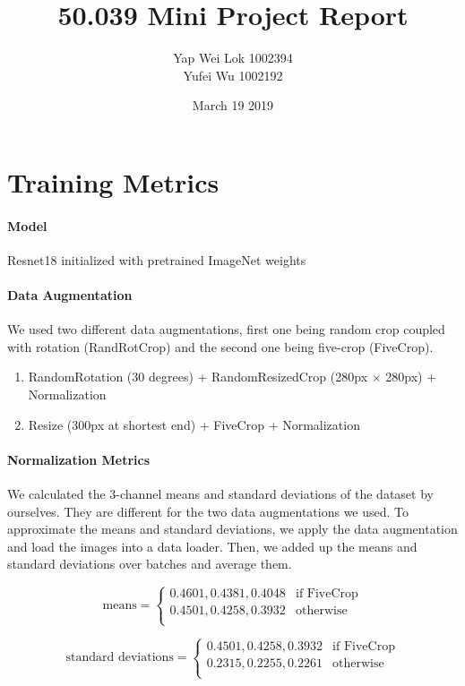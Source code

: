 \documentclass{article}
\title{50.039 Mini Project Report}
\author{Yap Wei Lok 1002394 \\
        Yufei Wu 1002192}
\date{March 19 2019}
\begin{document}
\maketitle
\section{Training Metrics}
\paragraph{Model}
Resnet18 initialized with pretrained ImageNet weights

\paragraph{Data Augmentation}
We used two different data augmentations, first one being random crop coupled with rotation (RandRotCrop) and the second one being five-crop (FiveCrop).
\begin{enumerate}
    \item RandomRotation (30 degrees) + RandomResizedCrop (280px $\times$ 280px) + Normalization
    \item Resize (300px at shortest end) + FiveCrop + Normalization
\end{enumerate}

\paragraph{Normalization Metrics}
We calculated the 3-channel means and standard deviations of the dataset by ourselves. They are different for the two data augmentations we used. To approximate the means and standard deviations, we apply the data augmentation and load the images into a data loader. Then, we added up the means and standard deviations over batches and average them.

\begin{equation*}
    \text{means} =
    \begin{cases} 
        0.4601, 0.4381, 0.4048 & \text{if FiveCrop} \\
        0.4501, 0.4258, 0.3932 & \text{otherwise} \\
    \end{cases}
\end{equation*}

\begin{equation*}
    \text{standard deviations} =
    \begin{cases} 
        0.4501, 0.4258, 0.3932 & \text{if FiveCrop} \\
        0.2315, 0.2255, 0.2261 & \text{otherwise} \\
    \end{cases}
\end{equation*}
\end{document}
